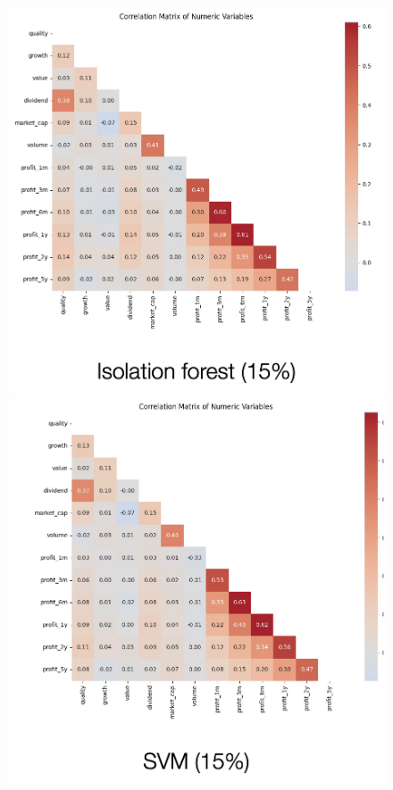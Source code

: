 \documentclass[11pt,english,a4paper,hidelinks]{book}
\begin{document}
\begin{figure}[H]
    \centering
    \begin{minipage}{0.32\textwidth}
        \centering
        \includegraphics[width=\textwidth]{images/code/outliers/IF 15.png}
    \end{minipage}
    \hfill
    \begin{minipage}{0.32\textwidth}
        \centering
        \includegraphics[width=\textwidth]{images/code/outliers/SVM 15.png}

\end{minipage}
\end{figure}
\end{document}
